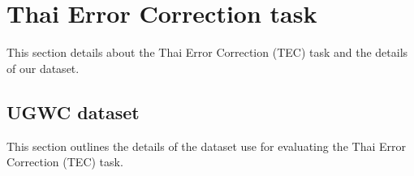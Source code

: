 \section{Thai Error Correction task}

This section details about the Thai Error Correction (TEC) task and the details of our dataset.

\subsection{UGWC dataset}

This section outlines the details of the dataset use for evaluating the Thai Error Correction (TEC) task.
